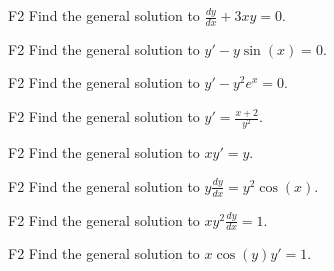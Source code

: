 \begin{problem}{F2}
Find the general solution to \(\frac{dy}{dx} + 3xy = 0\).
\end{problem}

\begin{problem}{F2}
Find the general solution to \(y' - y\sin(x)=0\).
\end{problem} 

\begin{problem}{F2}
Find the general solution to \(y' - y^2e^x=0\).
\end{problem} 

\begin{problem}{F2}
Find the general solution to \(y' = \frac{x+2}{y^2}\).
\end{problem}


\begin{problem}{F2}
Find the general solution to \(xy' = y\).
\end{problem}

\begin{problem}{F2}
Find the general solution to \(y\frac{dy}{dx} = y^2\cos(x)\).
\end{problem}

\begin{problem}{F2}
Find the general solution to \(xy^2\frac{dy}{dx} = 1\).
\end{problem}

\begin{problem}{F2}
Find the general solution to \(x\cos(y)y' = 1\).
\end{problem}
